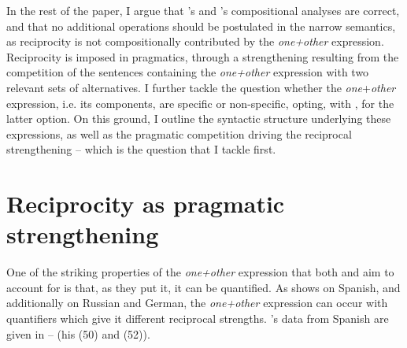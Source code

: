 \documentclass[output=paper,colorlinks,citecolor=brown]{langscibook}
\begin{document}
In the rest of the paper, I argue that \citeauthor{v10}'s %
and \citeauthor{z14}'s %
compositional analyses are correct, and that no additional operations should be postulated in the narrow semantics, as reciprocity is not compositionally contributed by the \textit{one+other} expression. Reciprocity is imposed in pragmatics, through a strengthening resulting from the competition of the sentences containing the \textit{one+other} expression with two relevant sets of alternatives. I further tackle the question whether the \textit{one}+\textit{other} expression, i.e. its components, are specific or non-specific, opting, with \citeauthor{v10}%
, for the latter option. On this ground, I outline the syntactic structure underlying these expressions, as well as the pragmatic competition driving the reciprocal strengthening -- which is the question that I tackle first.

\section{Reciprocity as pragmatic strengthening}\label{sec:3}

One of the striking properties of the \textit{one+other} expression that both \citet{z14} and \citet{v10} %
aim to account for is that, as they put it, it can be quantified. As \citeauthor{v10} %
shows on Spanish, and \citeauthor{z14} %
additionally on Russian and German, the \textit{one+other} expression can occur with quantifiers which give it different reciprocal strengths. \citeauthor{v10}'s data from Spanish are given in -- (his (50) and (52)).

\ea\label{ex:Todos}
\label{ex:Todos-a}

\label{ex:Todos-b}

\label{ex:Todos-c}
 \z \z
\end{document}
